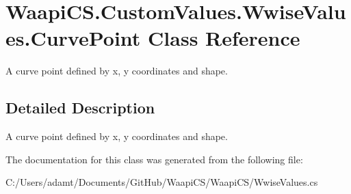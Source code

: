 \hypertarget{class_waapi_c_s_1_1_custom_values_1_1_wwise_values_1_1_curve_point}{}\section{Waapi\+C\+S.\+Custom\+Values.\+Wwise\+Values.\+Curve\+Point Class Reference}
\label{class_waapi_c_s_1_1_custom_values_1_1_wwise_values_1_1_curve_point}


A curve point defined by x, y coordinates and shape.  




\subsection{Detailed Description}
A curve point defined by x, y coordinates and shape. 



The documentation for this class was generated from the following file\+:\begin{DoxyCompactItemize}
\item 
C\+:/\+Users/adamt/\+Documents/\+Git\+Hub/\+Waapi\+C\+S/\+Waapi\+C\+S/Wwise\+Values.\+cs\end{DoxyCompactItemize}

